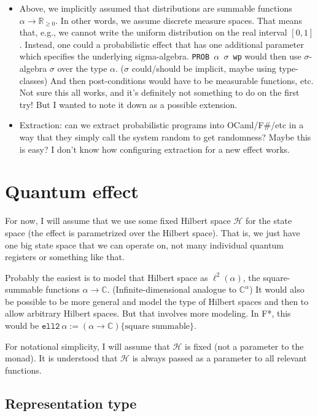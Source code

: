 \documentclass[a4paper]{article}
\newcommand\setR{\mathbb R}
\newcommand\Rpos{\setR_{\geq0}}
\newcommand\elltwo{\ell^2}
\newcommand\setC{\mathbb C}
\newcommand\calH{\mathcal H}
\begin{document}
\begin{itemize}
\item Above, we implicitly assumed that distributions are summable
  functions $\alpha\to\Rpos$. In other words, we assume discrete
  measure spaces. That means that, e.g., we cannot write the uniform
  distribution on the real interval $[0,1]$. Instead, one could a
  probabilistic effect that has one additional parameter which
  specifies the underlying sigma-algebra. \texttt{PROB $\alpha$
    $\sigma$ wp} would then use $\sigma$-algebra $\sigma$ over the
  type $\alpha$. ($\sigma$ could/should be implicit, maybe using
  type-classes) And then post-conditions would have to be measurable
  functions, etc. Not sure this all works, and it's definitely not
  something to do on the first try! But I wanted to note it down as a
  possible extension.
\item Extraction: can we extract probabilistic programs into
  OCaml/F\#/etc in a way that they simply call the system random to
  get randomness? Maybe this is easy? I don't know how configuring
  extraction for a new effect works.
\end{itemize}

\section{Quantum effect}

For now, I will assume that we use some fixed Hilbert space $\calH$
for the state space (the effect is parametrized over the Hilbert
space). That is, we just have one big state space that we can operate
on, not many individual quantum registers or something like that.

Probably the easiest is to model that Hilbert space as
$\elltwo(\alpha)$, the square-summable functions
$\alpha\to\setC$. (Infinite-dimensional analogue to $\setC^\alpha$) It
would also be possible to be more general and model the type of
Hilbert spaces and then to allow arbitrary Hilbert spaces. But that
involves more modeling. In F*, this would be
$\mathtt{ell2}\ \alpha := (\alpha\to\setC)\{\text{square
  summable}\}$.

For notational simplicity, I will assume that $\calH$ is fixed (not a
parameter to the monad). It is understood that $\calH$ is always
passed as a parameter to all relevant functions.


\subsection{Representation type}
\end{document}

